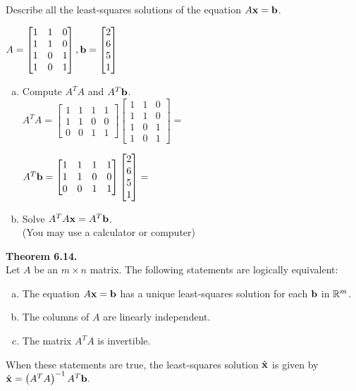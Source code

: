 \begin{exercise} %
	Describe all the least-squares solutions of the equation $A\boldsymbol{\mathbf{x}}=\boldsymbol{\mathbf{b}}$.
	\begin{multicols}{2}
		$ A = \begin{bmatrix}1&1&0\\1&1&0\\1&0&1\\1&0&1\end{bmatrix}, 
		\boldsymbol{\mathbf{b}} = \begin{bmatrix}2\\6\\5\\1\end{bmatrix} $
		\begin{enumerate}[(a)]
			\item Compute $A^TA$ and $A^T\boldsymbol{\mathbf{b}}$. \\
			$ A^TA = \begin{bmatrix}1&1&1&1\\1&1&0&0\\0&0&1&1\end{bmatrix} \begin{bmatrix}1&1&0\\1&1&0\\1&0&1\\1&0&1\end{bmatrix} = $
			
			\vspace{2em}
			$ A^T\boldsymbol{\mathbf{b}} = \begin{bmatrix}1&1&1&1\\1&1&0&0\\0&0&1&1\end{bmatrix} \begin{bmatrix}2\\6\\5\\1\end{bmatrix} = $
			\columnbreak
			\item Solve $A^TA\boldsymbol{\mathbf{x}} = A^T\boldsymbol{\mathbf{b}}$. \\
			(You may use a calculator or computer)
		\end{enumerate}
	\end{multicols}
\end{exercise}
\vspace{2em}


\begin{boxthm}
	\textbf{Theorem 6.14.} \\
	Let $A$ be an $m\times n$ matrix. The following statements are logically equivalent:
	\vspace{-1ex}
	\begin{enumerate}[(a)]\itemsep=0em
		\item The equation $A\boldsymbol{\mathbf{x}}=\boldsymbol{\mathbf{b}}$ has a unique least-squares solution for each $\boldsymbol{\mathbf{b}}$ in $\mathbb{R}^m$.
		\item The columns of $A$ are linearly independent.
		\item The matrix $A^TA$ is invertible.
	\end{enumerate}
	\vspace{-1ex}
	When these statements are true, the least-squares solution $\hat{\boldsymbol{\mathbf{x}}}$ is given by
	$ \hat{\boldsymbol{\mathbf{x}}} = \left(A^TA\right)^{-1}A^T\boldsymbol{\mathbf{b}}. $
\end{boxthm}



